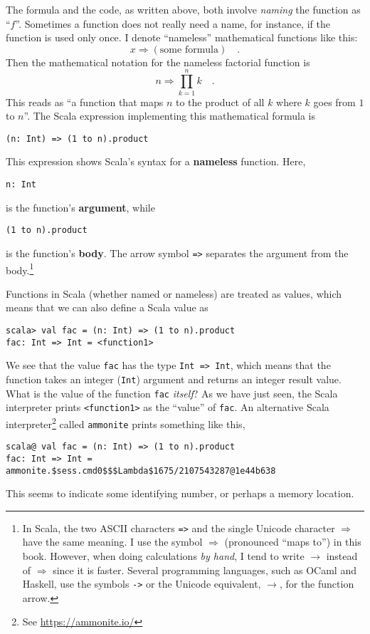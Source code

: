 The formula and the code, as written above, both involve \emph{naming}
the function as ``$f$''. Sometimes a function does not really need
a name, \textendash{} for instance, if the function is used only once.
I denote ``nameless'' mathematical functions like this: 
\[
x\Rightarrow\left(\text{some formula}\right)\quad.
\]
Then the mathematical notation for the nameless factorial function
is
\[
n\Rightarrow\prod_{k=1}^{n}k\quad.
\]
This reads as ``a function that maps $n$ to the product of all $k$
where $k$ goes from $1$ to $n$''. The Scala expression implementing
this mathematical formula is
\begin{lstlisting}
(n: Int) => (1 to n).product
\end{lstlisting}
This expression shows Scala's syntax for a \textbf{nameless}
function. Here, 
\begin{lstlisting}
n: Int
\end{lstlisting}
is the function's \textbf{argument}, while
\begin{lstlisting}
(1 to n).product
\end{lstlisting}
is the function's \textbf{body}. The arrow symbol \lstinline!=>!
separates the argument from the body.\footnote{In Scala, the two ASCII characters \lstinline!=>! and the single
Unicode character $\Rightarrow$ have the same meaning. I use the
symbol $\Rightarrow$ (pronounced ``maps to'') in this book. However,
when doing calculations \emph{by hand}, I tend to write $\rightarrow$
instead of $\Rightarrow$ since it is faster. Several programming
languages, such as OCaml and Haskell, use the symbols \lstinline!->!
or the Unicode equivalent, $\rightarrow$, for the function arrow.} 

Functions in Scala (whether named or nameless) are treated as values,
which means that we can also define a Scala value as
\begin{lstlisting}
scala> val fac = (n: Int) => (1 to n).product
fac: Int => Int = <function1>
\end{lstlisting}
We see that the value \lstinline!fac! has the type \lstinline!Int => Int!,
which means that the function takes an integer (\lstinline!Int!)
argument and returns an integer result value. What is the value of
the function \lstinline!fac! \emph{itself}? As we have just seen,
the Scala interpreter prints \lstinline!<function1>! as the ``value''
of \lstinline!fac!. An alternative Scala interpreter\footnote{See \href{https://ammonite.io/}{https://ammonite.io/}}
called \texttt{ammonite} prints something like this,
\begin{lstlisting}
scala@ val fac = (n: Int) => (1 to n).product
fac: Int => Int = ammonite.$sess.cmd0$$$Lambda$1675/2107543287@1e44b638
\end{lstlisting}
This seems to indicate some identifying number, or perhaps a memory
location.

